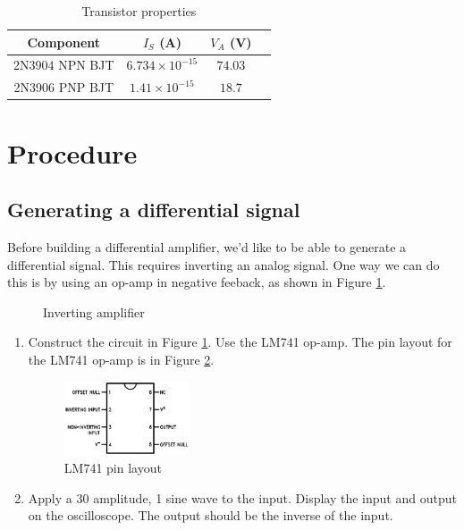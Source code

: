 \documentclass{article}
\begin{document}
\begin{table}[!htb]
  \begin{center}
    \begin{tabular}{|c|c|c|c|} \hline
      Component & $I_S$ (A) & $V_A$ (V) \\\hline
      2N3904 NPN BJT & $6.734 \times 10^{-15}$ & $74.03$ \\
      2N3906 PNP BJT & $1.41 \times 10^{-15}$ & $18.7$ \\\hline
    \end{tabular}
    \caption{Transistor properties}
    \label{params}
  \end{center}
\end{table}

\section{Procedure}

\subsection{Generating a differential signal}

Before building a differential amplifier, we'd like to be able to generate a differential signal. This requires inverting an analog signal. One way we can do this is by using an op-amp in negative feeback, as shown in Figure \ref{inverter}.

\begin{figure}[!htb]
  
  \centerline{\box\graph}
  \caption{Inverting amplifier}
  \label{inverter}
\end{figure}

\begin{enumerate}
  \item Construct the circuit in Figure \ref{inverter}. Use the LM741 op-amp. The pin layout for the LM741 op-amp is in Figure \ref{LM741}. 

\begin{figure}[!htb]
  \centering
  \includegraphics[width=0.35\textwidth]{LM741.eps}
  \caption{LM741 pin layout}
  \label{LM741}
\end{figure}

  \item Apply a \unit{30}{\milli\volt} amplitude, \unit{1}{\kilo\hertz} sine wave to the input. Display the input and output on the oscilloscope. The output should be the inverse of the input.
\end{enumerate}
\end{document}
